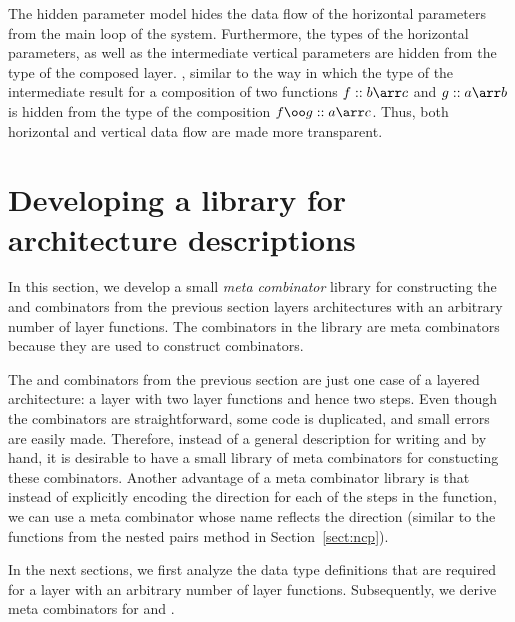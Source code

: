 \documentclass[preprint,natbib]{sigplanconf}
\begin{document}

The hidden parameter model hides the data flow of the horizontal parameters from the main loop of the system. Furthermore, the types of the horizontal parameters, as well as the intermediate vertical parameters are hidden from the type of the composed layer. \bc, similar to the way in which the type of the intermediate result for a composition of two functions $f :: b \arr c$ and $g :: a \arr b$ is hidden from the type of the composition $f \oo g :: a \arr c$. \ec Thus, both horizontal and vertical data flow are made more transparent. 



%																
%																
%																
\section{Developing a library for architecture descriptions} \label{sect:lib}

In this section, we develop a small {\em meta combinator} library for constructing the  and  combinators from the previous section  layers architectures with an arbitrary number of layer functions. The combinators in the library are meta combinators because they are used to construct combinators.

The  and  combinators from the previous section are just one case of a layered architecture: a layer with two layer functions and hence two steps. Even though the combinators are straightforward, some code is duplicated, and small errors are easily made. Therefore, instead of a general description for writing  and  by hand, it is desirable to have a small library of meta combinators for constucting these combinators. Another advantage of a meta combinator library is that instead of explicitly encoding the direction for each of the steps in the  function, we can use a meta combinator whose name reflects the direction (similar to the  functions from the nested pairs method in Section~\ref{sect:ncp}).

In the next sections, we first analyze the data type definitions that are required for a layer with an arbitrary number of layer functions. Subsequently, we derive meta combinators for  and . 
\end{document}
